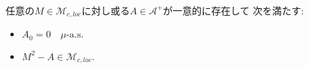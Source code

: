 	\begin{itembox}[l]{}
		\begin{thm}[二次変分の存在]\mbox{}\\
			任意の$M \in \mathcal{M}_{c,loc}$に対し或る$A \in \mathcal{A}^+$が一意的に存在して\footnotemark
			次を満たす:
			\begin{itemize}
				\item $A_0 = 0\quad \mbox{$\mu$-a.s.}$
				\item $M^2 - A \in \mathcal{M}_{c,loc}.$
			\end{itemize}
		\end{thm}
	\end{itembox}
	
	
